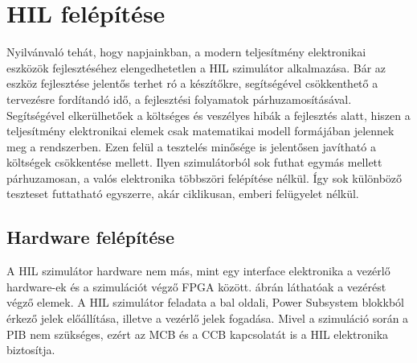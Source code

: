 \chapter{HIL felépítése}

Nyilvánvaló tehát, hogy napjainkban, a modern teljesítmény elektronikai eszközök fejlesztéséhez elengedhetetlen a HIL szimulátor alkalmazása. Bár az eszköz fejlesztése jelentős terhet ró a készítőkre, segítségével csökkenthető a tervezésre fordítandó idő, a fejlesztési folyamatok párhuzamosításával. Segítségével elkerülhetőek a költséges és veszélyes hibák a fejlesztés alatt, hiszen a teljesítmény elektronikai elemek csak matematikai modell formájában jelennek meg a rendszerben. Ezen felül a tesztelés minősége is jelentősen javítható a költségek csökkentése mellett. Ilyen szimulátorból sok futhat egymás mellett párhuzamosan, a valós elektronika többszöri felépítése nélkül. Így sok különböző teszteset futtatható egyszerre, akár ciklikusan, emberi felügyelet nélkül. \cite{dirac}

\section{Hardware felépítése}

A HIL szimulátor hardware nem más, mint egy interface elektronika a vezérlő hardware-ek és a szimulációt végző FPGA között.  ábrán láthatóak a vezérést végző elemek. A HIL szimulátor feladata a bal oldali, Power Subsystem blokkból érkező jelek előállítása, illetve a vezérlő jelek fogadása. Mivel a szimuláció során a PIB nem szükséges, ezért az MCB és a CCB kapcsolatát is a HIL elektronika biztosítja.


